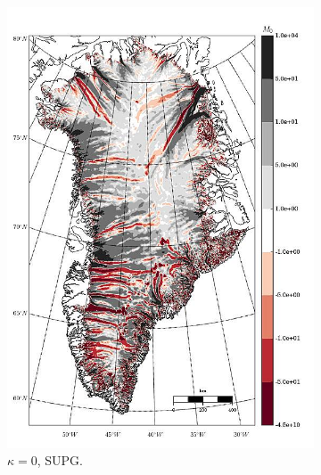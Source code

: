 \begin{figure}
\begin{subfigure}[b]{0.25\linewidth}
    \includegraphics[width=\linewidth]{images/balance_velocity/greenland/d_U_ob/misfit_5H_kappa_0_SUPG.jpg}
  \caption{$\kappa = 0$, SUPG.}
  \label{greenland_bv_image_d_U_ob_kappa_0_SUPG_misfit}
  \end{subfigure}
  \begin{subfigure}[b]{0.25\linewidth}

\end{subfigure}
\end{figure}
